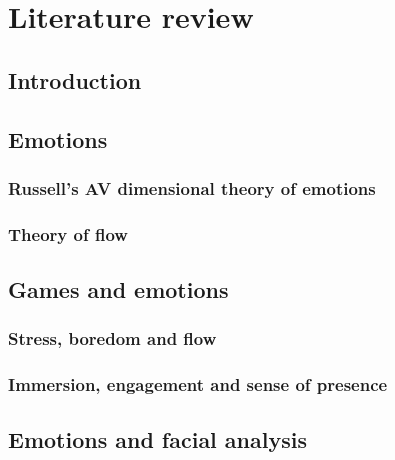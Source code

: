 \chapter{Literature review}

\section{Introduction}

\section{Emotions}
\subsection{Russell's AV dimensional theory of emotions}
\subsection{Theory of flow}

\section{Games and emotions}
\subsection{Stress, boredom and flow}
\subsection{Immersion, engagement and sense of presence}

\section{Emotions and facial analysis}

